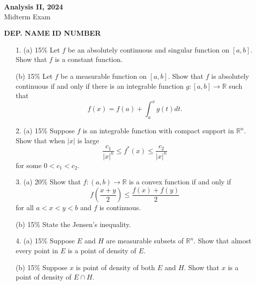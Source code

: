 \documentclass{article}
\begin{document}
\begin{center}
    \textbf{Analysis II, 2024} \\
    Midterm Exam
\end{center}


\noindent \textbf{DEP.} \underline{\hspace{1.5cm}} \hspace{0.5cm} \textbf{NAME} \underline{\hspace{2.5cm}} \hspace{0.5cm} \textbf{ID NUMBER} \underline{\hspace{1.5cm}}


\begin{enumerate}
    \item[1. (a) 15\%] Let \( f \) be an absolutely continuous and singular function on \([a, b]\). Show that \( f \) is a constant function.
    \item[(b) 15\%] Let \( f \) be a measurable function on \([a, b]\). Show that \( f \) is absolutely continuous if and only if there is an integrable function \( g : [a, b] \rightarrow \mathbb{R} \) such that
    \[
    f(x) = f(a) + \int_{a}^{x} g(t) dt.
    \]

    \item[2. (a) 15\%] Suppose \( f \) is an integrable function with compact support in \( \mathbb{R}^n \). Show that when \( |x| \) is large
    \[
    \frac{c_1}{|x|^n} \leq f^*(x) \leq \frac{c_2}{|x|^n}
    \]
    for some \( 0 < c_1 < c_2 \).
    
    \item[3. (a) 20\%] Show that \( f : (a, b) \rightarrow \mathbb{R} \) is a convex function if and only if
    \[
    f\left(\frac{x + y}{2}\right) \leq \frac{f(x) + f(y)}{2}
    \]
    for all \( a < x < y < b \) and \( f \) is continuous.
    \item[(b) 15\%] State the Jensen’s inequality.
    
    \item[4. (a) 15\%] Suppose \( E \) and \( H \) are measurable subsets of \( \mathbb{R}^n \). Show that almost every point in \( E \) is a point of density of \( E \). 
    \item[(b) 15\%] Suppose \( x \) is point of density of both \( E \) and \( H \). Show that \( x \) is a point of density of \( E \cap H \).
\end{enumerate}
\end{document}
